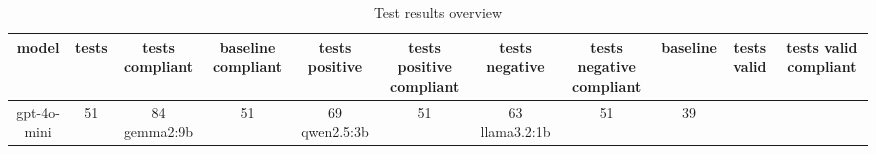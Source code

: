 
  \begin{table}[h!]
  \centering
  \begin{tabular}{|c|c|c|c|c|c|c|c|c|c|c|}
  \hline
  model & tests & tests compliant & baseline compliant & tests positive & tests positive compliant & tests negative & tests negative compliant & baseline & tests valid & tests valid compliant \\
  \hline
  gpt-4o-mini & 51 & 84%
\hline
gemma2:9b & 51 & 69%
\hline
qwen2.5:3b & 51 & 63%
\hline
llama3.2:1b & 51 & 39%
  \end{tabular}
  \caption{Test results overview}
  
  \end{table}
  
